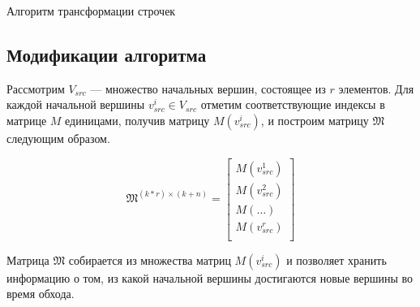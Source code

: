 \begin{algorithm}[H]
  \caption{Алгоритм трансформации строчек}\label{AlgoTransformRows}
  \begin{algorithmic}[1]
        \EndFor
    \EndProcedure
  \end{algorithmic}
\end{algorithm}

\pagebreak

\subsection{Модификации алгоритма}

Рассмотрим $V_{src}$ --- множество начальных вершин, состоящее из $r$ элементов. Для каждой начальной вершины $v_{src}^i \in V_{src}$ отметим соответствующие индексы в матрице $M$ единицами, получив матрицу $M(v_{src}^i)$,  и построим матрицу $\mathfrak{M}$ следующим образом.

\begin{equation}
\mathfrak{M}^{(k*r) \times (k + n)} =
  \left[
    \begin{matrix}
        M(v_{src}^1) \\
        M(v_{src}^2) \\ 
        M(\dots) \\
        M(v_{src}^r) \\
    \end{matrix}
  \right]
\end{equation}

Матрица $\mathfrak{M}$ собирается из множества матриц $M(v_{src}^i)$ и позволяет хранить информацию о том, из какой начальной вершины достигаются новые вершины во время обхода. 

